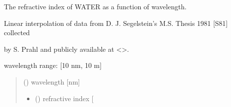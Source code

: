 \documentclass[letterpaper,10pt,english]{sphinxmanual}
\begin{document}
\begin{fulllineitems}
\label{\detokenize{05_refractive_index:skinoptics.refractive_index.n_wat_Segelstein}}
\pysigstartsignatures
{}
\pysigstopsignatures
\begin{DUlineblock}{0em}
\item[] The refractive index of WATER as a function of wavelength.
\item[] Linear interpolation of data from D. J. Segelstein’s M.S. Thesis 1981 {[}S81{]} collected
\item[] by S. Prahl and publicly available at \textless{}\textgreater{}.
\end{DUlineblock}

\begin{DUlineblock}{0em}
\item[] wavelength range: {[}10 nm, 10 m{]}
\end{DUlineblock}
\begin{quote}\begin{description}
\sphinxAtStartPar
{} () \textendash{} wavelength {[}nm{]}

\sphinxAtStartPar
\begin{itemize}
\item {} 
\sphinxAtStartPar
{} () \textendash{} refractive index {[}\sphinxhyphen{}{]}

\end{itemize}


\end{description}\end{quote}

\end{fulllineitems}


\sphinxstepscope
\end{document}
